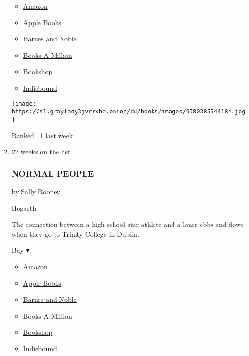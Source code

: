 \begin{enumerate}
  \begin{itemize}
  \tightlist
  \item
    \href{https://www.amazon.com/Guardians-Novel-John-Grisham/dp/0385544189?tag=NYTBS-20}{Amazon}
  \item
    \href{https://du-gae-books-dot-nyt-du-prd.appspot.com/buy?title=THE+GUARDIANS\&author=John+Grisham}{Apple
    Books}
  \item
    \href{https://www.anrdoezrs.net/click-7990613-11819508?url=https\%3A\%2F\%2Fwww.barnesandnoble.com\%2Fw\%2F\%3Fean\%3D9780593129982}{Barnes
    and Noble}
  \item
    \href{https://www.anrdoezrs.net/click-7990613-35140?url=https\%3A\%2F\%2Fwww.booksamillion.com\%2Fp\%2FTHE\%2BGUARDIANS\%2FJohn\%2BGrisham\%2F9780593129982}{Books-A-Million}
  \item
    \href{https://bookshop.org/a/3546/9780593129982}{Bookshop}
  \item
    \href{https://www.indiebound.org/book/9780593129982?aff=NYT}{Indiebound}
  \end{itemize}

  \texttt{[image: https://s1.graylady3jvrrxbe.onion/du/books/images/9780385544184.jpg]}

  Ranked 11 last week
\item
  \href{https://www.nytimes3xbfgragh.onion/2019/04/08/books/review-normal-people-sally-rooney.html}{}

  22 weeks on the list

  \hypertarget{normal-people}{%
  \subsubsection{NORMAL PEOPLE}\label{normal-people}}

  by Sally Rooney

  Hogarth

  The connection between a high school star athlete and a loner ebbs and
  flows when they go to Trinity College in Dublin.

  Buy ▾

  \begin{itemize}
  \tightlist
  \item
    \href{https://www.amazon.com/Normal-People-Novel-Sally-Rooney/dp/1984822179?tag=NYTBS-20}{Amazon}
  \item
    \href{https://du-gae-books-dot-nyt-du-prd.appspot.com/buy?title=NORMAL+PEOPLE\&author=Sally+Rooney}{Apple
    Books}
  \item
    \href{https://www.anrdoezrs.net/click-7990613-11819508?url=https\%3A\%2F\%2Fwww.barnesandnoble.com\%2Fw\%2F\%3Fean\%3D9781984822185}{Barnes
    and Noble}
  \item
    \href{https://www.anrdoezrs.net/click-7990613-35140?url=https\%3A\%2F\%2Fwww.booksamillion.com\%2Fp\%2FNORMAL\%2BPEOPLE\%2FSally\%2BRooney\%2F9781984822185}{Books-A-Million}
  \item
    \href{https://bookshop.org/a/3546/9781984822185}{Bookshop}
  \item
    \href{https://www.indiebound.org/book/9781984822185?aff=NYT}{Indiebound}
  \end{itemize}


\end{enumerate}
